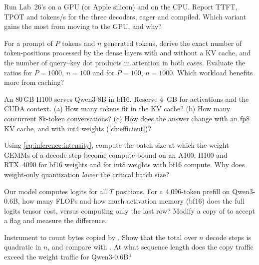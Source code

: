 \begin{exercise}
Run Lab~26's  on a GPU (or Apple silicon) and on the CPU. Report TTFT, TPOT and
tokens/s for the three decoders, eager and compiled. Which variant gains the most from moving to
the GPU, and why?
\end{exercise}

\begin{exercise}
For a prompt of $P$ tokens and $n$ generated tokens, derive the exact number of token-positions
processed by the dense layers with and without a KV cache, and the number of query--key dot
products in attention in both cases. Evaluate the ratios for $P=1000$, $n=100$ and for $P=100$,
$n=1000$. Which workload benefits more from caching?
\end{exercise}

\begin{exercise}
An 80\,GB H100 serves Qwen3-8B in bf16. Reserve \SI{4}{GB} for activations and the CUDA context.
(a) How many tokens fit in the KV cache? (b) How many concurrent 8k-token conversations? (c) How
does the answer change with an fp8 KV cache, and with int4 weights (\cref{ch:efficient})?
\end{exercise}

\begin{exercise}
Using \cref{eq:inference:intensity}, compute the batch size at which the weight GEMMs of a decode
step become compute-bound on an A100, H100 and RTX~4090 for bf16 weights and for int8 weights with
bf16 compute. Why does weight-only quantization \emph{lower} the critical batch size?
\end{exercise}

\begin{exercise}
Our model computes logits for all $T$ positions. For a 4,096-token prefill on Qwen3-0.6B, how many
FLOPs and how much activation memory (bf16) does the full logits tensor cost, versus computing only
the last row? Modify a copy of  to accept a  flag and
measure the difference.
\end{exercise}

\begin{exercise}
Instrument  to count bytes copied by . Show that the total over
$n$ decode steps is quadratic in $n$, and compare with . At what sequence length
does the copy traffic exceed the weight traffic for Qwen3-0.6B?
\end{exercise}

